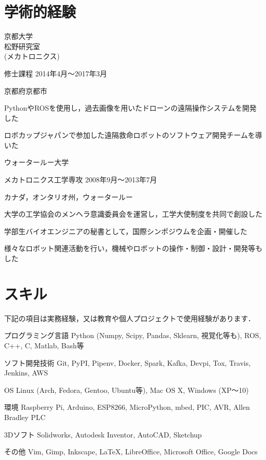 \documentclass[10pt, a4paper]{article}
\begin{document}
\section{学術的経験}

\begin{outerlist}
\item[{\parbox[t]{3cm}{\raggedleft 京都大学\\松野研究室\\(メカトロニクス)}}]{修士課程} \hfill {2014年4月〜2017年3月}

\vspace{-2\baselineskip}
\hfill 京都府京都市
  \begin{innerlist}
  \item PythonやROSを使用し，過去画像を用いたドローンの遠隔操作システムを開発した
  \item ロボカップジャパンで参加した遠隔救命ロボットのソフトウェア開発チームを導いた
  \end{innerlist}

\item[{\parbox[t]{3cm}{\raggedleft ウォータールー大学}}]{メカトロニクス工学専攻} \hfill {2008年9月〜2013年7月}

\hfill カナダ，オンタリオ州，ウォータールー
  \begin{innerlist}
  \item 大学の工学協会のメンヘラ意識委員会を運営し，工学大使制度を共同で創設した
  \item 学部生バイオエンジニアの秘書として，国際シンポジウムを企画・開催した
  \item 様々なロボット関連活動を行い，機械やロボットの操作・制御・設計・開発等もした
  \end{innerlist}

\end{outerlist}

\section{スキル}
下記の項目は実務経験，又は教育や個人プロジェクトで使用経験があります．
\begin{outerlist}
\item[プログラミング言語] Python (Numpy, Scipy, Pandas, Sklearn, 視覚化等も), ROS, C++, C, Matlab, Bash等
\item[ソフト開発技術] Git, PyPI, Pipenv, Docker, Spark, Kafka, Devpi, Tox, Travis, Jenkins, AWS
\item[OS] Linux (Arch, Fedora, Gentoo, Ubuntu等), Mac OS X, Windows (XP〜10)
\item[環境] Raspberry Pi, Arduino, ESP8266, MicroPython, mbed, PIC, AVR, Allen Bradley PLC
\item[3Dソフト] Solidworks, Autodesk Inventor, AutoCAD, Sketchup
\item[その他] Vim, Gimp, Inkscape, \LaTeX, LibreOffice, Microsoft Office, Google Docs
\end{outerlist}
\end{document}
